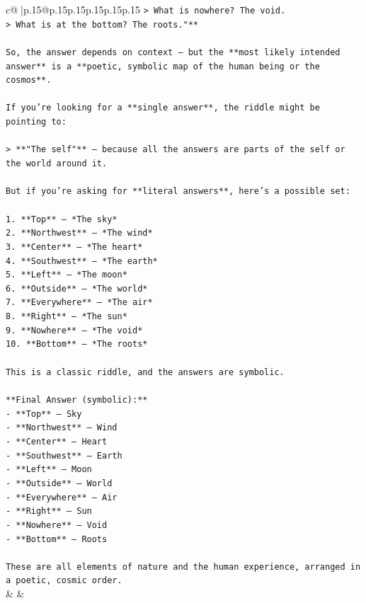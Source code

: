 \documentclass{article}
\begin{document}
{\begin{supertabular}{c@{$\;$}|p{.15\linewidth}@{}p{.15\linewidth}p{.15\linewidth}p{.15\linewidth}p{.15\linewidth}p{.15\linewidth}}
{{{\texttt{> What is nowhere? The void.  } \\
\texttt{> What is at the bottom? The roots."**} \\
\\ 
\texttt{So, the answer depends on context — but the **most likely intended answer** is a **poetic, symbolic map of the human being or the cosmos**.} \\
\\ 
\texttt{If you're looking for a **single answer**, the riddle might be pointing to:} \\
\\ 
\texttt{> **"The self"** — because all the answers are parts of the self or the world around it.} \\
\\ 
\texttt{But if you're asking for **literal answers**, here’s a possible set:} \\
\\ 
\texttt{1. **Top** — *The sky*  } \\
\texttt{2. **Northwest** — *The wind*  } \\
\texttt{3. **Center** — *The heart*  } \\
\texttt{4. **Southwest** — *The earth*  } \\
\texttt{5. **Left** — *The moon*  } \\
\texttt{6. **Outside** — *The world*  } \\
\texttt{7. **Everywhere** — *The air*  } \\
\texttt{8. **Right** — *The sun*  } \\
\texttt{9. **Nowhere** — *The void*  } \\
\texttt{10. **Bottom** — *The roots*} \\
\\ 
\texttt{This is a classic riddle, and the answers are symbolic.} \\
\\ 
\texttt{**Final Answer (symbolic):**  } \\
\texttt{{-} **Top** — Sky  } \\
\texttt{{-} **Northwest** — Wind  } \\
\texttt{{-} **Center** — Heart  } \\
\texttt{{-} **Southwest** — Earth  } \\
\texttt{{-} **Left** — Moon  } \\
\texttt{{-} **Outside** — World  } \\
\texttt{{-} **Everywhere** — Air  } \\
\texttt{{-} **Right** — Sun  } \\
\texttt{{-} **Nowhere** — Void  } \\
\texttt{{-} **Bottom** — Roots} \\
\\ 
\texttt{These are all elements of nature and the human experience, arranged in a poetic, cosmic order.} \\
            }
        }
    }
    & & \\ \\


\end{supertabular}}
\end{document}
